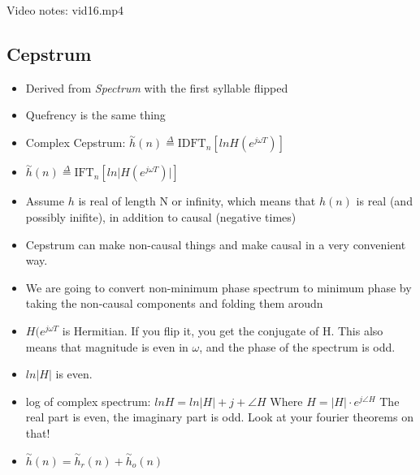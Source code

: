 Video notes: vid16.mp4
\subsection*{Cepstrum}

\begin{itemize}
\item{Derived from \textit{Spectrum} with the first syllable flipped}
\item{Quefrency is the same thing}
\item{Complex Cepstrum: $
\stackrel{\sim}{h}(n) \stackrel{\Delta}{=} \mbox{IDFT}_n [ln H(e^{j\omega T})]
$}
\item{
$
\stackrel{\sim}{h}(n) \stackrel{\Delta}{=} \mbox{IFT}_n [ln 
\vert H(e^{j\omega T}) \vert ]
$
}
\item{Assume $h$ is real of length N or infinity, which means that
$h(n)$ is real (and possibly inifite)}, in addition to causal (negative times)
\item{
Cepstrum can make non-causal things and make causal in a very convenient way.
}
\item{
We are going to convert non-minimum phase spectrum to minimum phase by taking
the non-causal components and folding them aroudn
}
\item{
$H(e^{j\omega T}$ is Hermitian. If you flip it, you get the conjugate of H.
This also means that magnitude is even in $\omega$, and the phase
of the spectrum is odd. 
}
\item{
$ln \vert H \vert$ is even. 
}
\item{
log of complex spectrum: 
$ln H = ln \vert H \vert + j + \angle H
$
Where $H = \vert H \vert \cdot e^{j \angle H} $
The real part is even, the imaginary part is odd. Look at your fourier theorems
on that!
}
\item{
$
\stackrel{\sim}{h}(n) = \stackrel{\sim}{h}_r(n) + \stackrel{\sim}{h}_o(n) 
$
}
\end{itemize}
